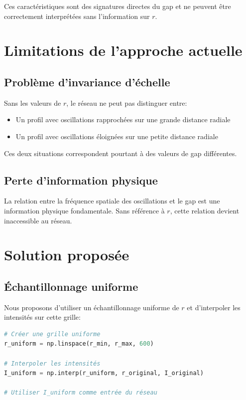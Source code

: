 \documentclass{article}
\begin{document}
Ces caractéristiques sont des signatures directes du gap et ne peuvent être correctement interprétées sans l'information sur $r$.

\section{Limitations de l'approche actuelle}

\subsection{Problème d'invariance d'échelle}
Sans les valeurs de $r$, le réseau ne peut pas distinguer entre:
\begin{itemize}
    \item Un profil avec oscillations rapprochées sur une grande distance radiale
    \item Un profil avec oscillations éloignées sur une petite distance radiale
\end{itemize}

Ces deux situations correspondent pourtant à des valeurs de gap différentes.

\subsection{Perte d'information physique}
La relation entre la fréquence spatiale des oscillations et le gap est une information physique fondamentale. Sans référence à $r$, cette relation devient inaccessible au réseau.


\section{Solution proposée}

\subsection{Échantillonnage uniforme}
Nous proposons d'utiliser un échantillonnage uniforme de $r$ et d'interpoler les intensités sur cette grille:

\begin{lstlisting}[language=Python, basicstyle=\small\ttfamily, backgroundcolor=\color{gray!10}]
# Créer une grille uniforme
r_uniform = np.linspace(r_min, r_max, 600)

# Interpoler les intensités
I_uniform = np.interp(r_uniform, r_original, I_original)

# Utiliser I_uniform comme entrée du réseau
\end{lstlisting}
\end{document}
